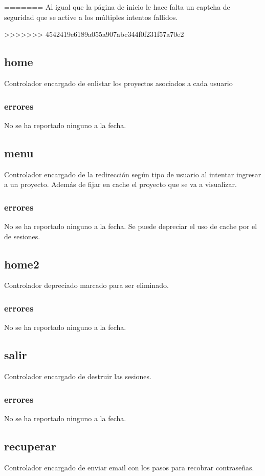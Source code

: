 \documentclass[10pt,a4paper]{book}
\begin{document}
=======
	Al igual que la página de inicio le hace falta un captcha de seguridad que se active a los múltiples intentos fallidos.
	
>>>>>>> 4542419e6189a055a907abc344f0f231f57a70e2
	\subsection{home}
	Controlador encargado de enlistar los proyectos asociados a cada usuario
	\subsubsection{errores}
	No se ha reportado ninguno a la fecha.

	\subsection{menu}
	Controlador encargado de la redirección según tipo de usuario al intentar ingresar a un proyecto. Además de fijar en cache el proyecto que se va a visualizar.
	\subsubsection{errores}
	No se ha reportado ninguno a la fecha. Se puede depreciar el uso de cache por el de sesiones.

	\subsection{home2}
	Controlador depreciado marcado para ser eliminado.
	\subsubsection{errores}
	No se ha reportado ninguno a la fecha.

	\subsection{salir}
	Controlador encargado de destruir las sesiones.
	\subsubsection{errores}
	No se ha reportado ninguno a la fecha.

	\subsection{recuperar}\label{recuperar}
	Controlador encargado de enviar email con los pasos para recobrar contraseñas.
\end{document}
